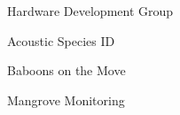 \item Hardware Development Group
\item Acoustic Species ID
\item Baboons on the Move
\item Mangrove Monitoring
